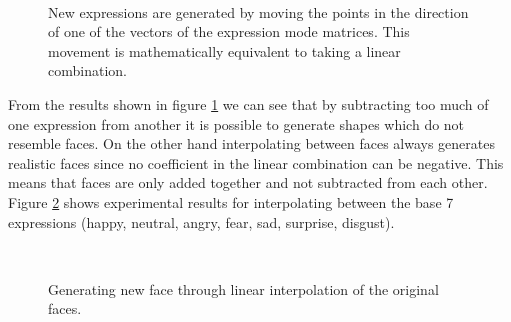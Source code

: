 \documentclass[11pt,a4paper]{report}
\begin{document}
\begin{figure}[H]
\centering
{}\\
\label{fg:faceaddsub}
\caption{New expressions are generated by moving the points in the direction of one of
  the vectors of the expression mode matrices. This movement is mathematically
  equivalent to taking a linear combination.}
\end{figure}

From the results shown in figure \ref{fg:faceaddsub} we can see that by
subtracting too much of one expression from another it is possible to generate
shapes which do not resemble faces. On the other hand interpolating between
faces always generates realistic faces since no coefficient in the linear
combination can be negative. This means that faces are only added together and
not subtracted from each other. Figure \ref{fg:faceinter} shows experimental
results for interpolating between the base 7 expressions (happy, neutral, angry,
fear, sad, surprise, disgust).

\begin{figure}[H]
\centering
{}\\
\label{fg:faceinter}
\caption{Generating new face through linear interpolation of the original faces.}
\end{figure}
\end{document}
